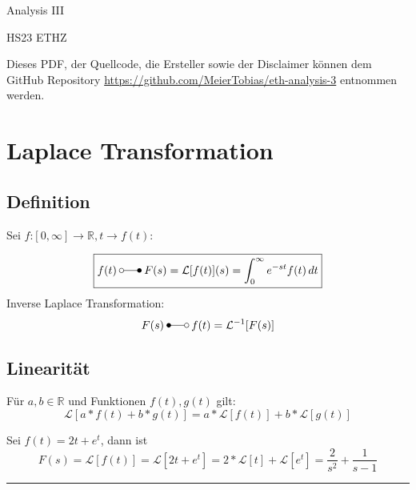 \documentclass[a4paper,10pt,landscape]{scrartcl}
\begin{document}
\begin{multicols*}{3}
%
\begin{center}
    \huge{Analysis III \par}
    \vspace{0.1cm}
    \large{HS23 ETHZ\par}
    \vspace{0.3cm}
\end{center}
Dieses PDF, der Quellcode, die Ersteller sowie der Disclaimer können dem GitHub Repository \url{https://github.com/MeierTobias/eth-analysis-3} entnommen werden.
\vspace{0.2cm}
%
\section{Laplace Transformation}
\subsection{Definition}
Sei $f$:$[0,\infty] \rightarrow \mathbb{R}, t \rightarrow f(t)$:

\begin{equation*}
    \boxed{
    f(t)\:\laplace\:F(s)=\mathcal{L}[f(t)](s)=\int_{0}^{\infty}e^{-st}f(t)\,dt 
    }
\end{equation*}
Inverse Laplace Transformation:
\begin{equation*}
    F(s)\:\Laplace\:f(t)=\mathcal{L}^{-1}[F(s)]
\end{equation*}

\subsection{Linearität}
Für $a,b \in \mathbb{R}$ und Funktionen $f(t),g(t)$ gilt:
\begin{equation*}
    \mathcal{L}[a*f(t)+b*g(t)] = a*\mathcal{L}[f(t)]+b*\mathcal{L}[g(t)]
\end{equation*}

\begin{examplesection}[Beispiele]
    Sei $f(t)=2t+e^t$, dann ist
    \begin{equation*}
        F(s)=\mathcal{L}[f(t)]=\mathcal{L}[2t+e^t]=2*\mathcal{L}[t] + \mathcal{L}[e^t]=\frac{2}{s^2}+\frac{1}{s-1}
    \end{equation*}
    \hrule{}
\end{examplesection}


\vfill\null %
\columnbreak
%

%  
\end{multicols*}
%
\end{document}
